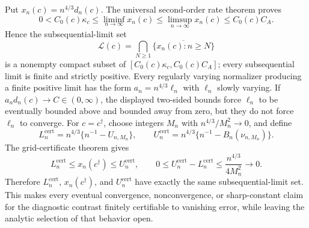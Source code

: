 Put \(x_n(c)=n^{4/3}d_n(c)\). The universal second-order rate theorem proves
\[
 0<C_0(c)\kappa_c\leq\liminf_{n\to\infty}x_n(c)
 \leq\limsup_{n\to\infty}x_n(c)\leq C_0(c)C_A.
\]
Hence the subsequential-limit set
\[
 \mathcal L(c)=\bigcap_{N\geq1}\overline{\{x_n(c):n\geq N\}}
\]
is a nonempty compact subset of \([C_0(c)\kappa_c,C_0(c)C_A]\); every subsequential limit is finite and strictly positive. Every regularly varying normalizer producing a finite positive limit has the form \(a_n=n^{4/3}\ell_n\) with \(\ell_n\) slowly varying. If \(a_nd_n(c)\to C\in(0,\infty)\), the displayed two-sided bounds force \(\ell_n\) to be eventually bounded above and bounded away from zero, but they do not force \(\ell_n\) to converge. For \(c=c^\dagger\), choose integers \(M_n\) with \(n^{4/3}/M_n^2\to0\), and define
\[
 L_n^{\mathrm{cert}}=n^{4/3}\{n^{-1}-U_{n,M_n}\},\qquad
 U_n^{\mathrm{cert}}=n^{4/3}\{n^{-1}-B_n(\nu_{n,M_n})\}.
\]
The grid-certificate theorem gives
\[
 L_n^{\mathrm{cert}}\leq x_n(c^\dagger)\leq U_n^{\mathrm{cert}},\qquad
 0\leq U_n^{\mathrm{cert}}-L_n^{\mathrm{cert}}\leq\frac{n^{4/3}}{4M_n^2}\longrightarrow0.
\]
Therefore \(L_n^{\mathrm{cert}}\), \(x_n(c^\dagger)\), and \(U_n^{\mathrm{cert}}\) have exactly the same subsequential-limit set. This makes every eventual convergence, nonconvergence, or sharp-constant claim for the diagnostic contrast finitely certifiable to vanishing error, while leaving the analytic selection of that behavior open.